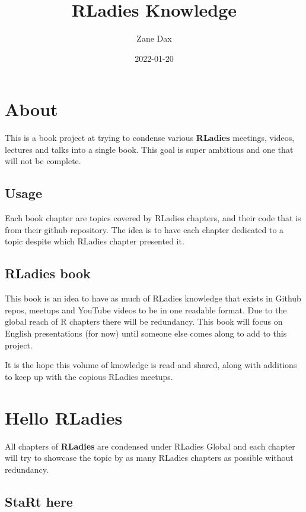 \documentclass[
]{book}
\title{RLadies Knowledge}
\author{Zane Dax}
\date{2022-01-20}
\theoremstyle{definition}
\theoremstyle{definition}
\theoremstyle{definition}
\theoremstyle{definition}
\theoremstyle{remark}
\begin{document}
\maketitle

{
\setcounter{tocdepth}{1}
\tableofcontents
}
\hypertarget{about}{%
\chapter{About}\label{about}}

This is a book project at trying to condense various \textbf{RLadies} meetings, videos, lectures and talks into a single book. This goal is super ambitious and one that will not be complete.

\hypertarget{usage}{%
\section{Usage}\label{usage}}

Each book chapter are topics covered by RLadies chapters, and their code that is from their github repository. The idea is to have each chapter dedicated to a topic despite which RLadies chapter presented it.

\hypertarget{rladies-book}{%
\section{RLadies book}\label{rladies-book}}

This book is an idea to have as much of RLadies knowledge that exists in Github repos, meetups and YouTube videos to be in one readable format. Due to the global reach of R chapters there will be redundancy. This book will focus on English presentations (for now) until someone else comes along to add to this project.

It is the hope this volume of knowledge is read and shared, along with additions to keep up with the copious RLadies meetups.

\hypertarget{hello-rladies}{%
\chapter{Hello RLadies}\label{hello-rladies}}

All chapters of \textbf{RLadies} are condensed under RLadies Global and each chapter will try to showcase the topic by as many RLadies chapters as possible without redundancy.

\hypertarget{start-here}{%
\section{StaRt here}\label{start-here}}
\end{document}
